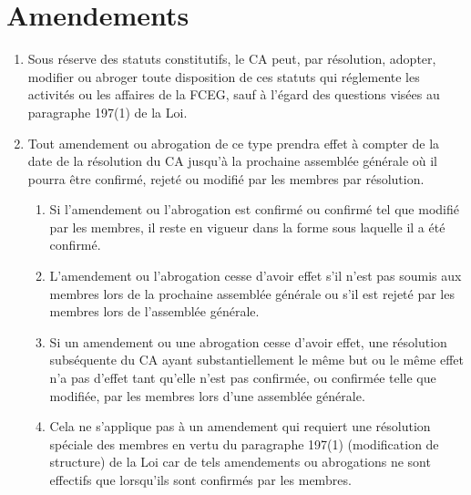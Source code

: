 \section{Amendements}
\label{amendements}

\begin{enumerate}
 \item Sous réserve des statuts constitutifs, le CA peut, par résolution, adopter, modifier ou abroger toute disposition de ces statuts qui réglemente les activités ou les affaires de la FCEG, sauf à l'égard des questions visées au paragraphe 197(1) de la Loi.
 \item Tout amendement ou abrogation de ce type prendra effet à compter de la date de la résolution du CA jusqu'à la prochaine assemblée générale où il pourra être confirmé, rejeté ou modifié par les membres par résolution.
  \begin{enumerate}
   \item Si l'amendement ou l'abrogation est confirmé ou confirmé tel que modifié par les membres, il reste en vigueur dans la forme sous laquelle il a été confirmé.
   \item L'amendement ou l'abrogation cesse d'avoir effet s'il n'est pas soumis aux membres lors de la prochaine assemblée générale ou s'il est rejeté par les membres lors de l'assemblée générale.
   \item Si un amendement ou une abrogation cesse d'avoir effet, une résolution subséquente du CA ayant substantiellement le même but ou le même effet n'a pas d'effet tant qu'elle n'est pas confirmée, ou confirmée telle que modifiée, par les membres lors d'une assemblée générale.
   \item Cela ne s'applique pas à un amendement qui requiert une résolution spéciale des membres en vertu du paragraphe 197(1) (modification de structure) de la Loi car de tels amendements ou abrogations ne sont effectifs que lorsqu'ils sont confirmés par les membres.
  \end{enumerate}
\end{enumerate}
